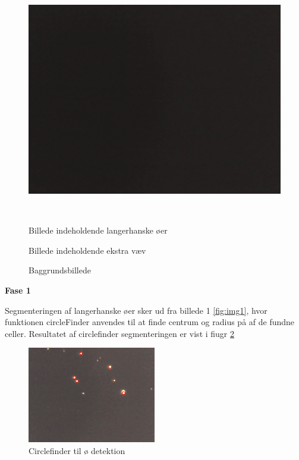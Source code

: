 \begin{figure}[htbp]
\begin{minipage}[b]{0.3\textwidth}
\includegraphics[width=1.00\textwidth]{billeder/software/3.jpg} %
\end{minipage} \\  %
\begin{minipage}[t]{0.3\textwidth}
\caption{Billede indeholdende langerhanske øer} %
\label{fig:img1}
\end{minipage} \hfill
\begin{minipage}[t]{0.3\textwidth}
\caption{Billede indeholdende ekstra væv} %
\label{fig:img2}
\end{minipage}
\hfill
\begin{minipage}[t]{0.3\textwidth}
\caption{Baggrundsbillede} %
\label{fig:img3}
\end{minipage}
\end{figure}

\textbf{Fase 1}

Segmenteringen af langerhanske øer sker ud fra billede 1 \ref{fig:img1}, hvor funktionen circleFinder anvendes til at finde centrum og radius på af de fundne celler. Resultatet af circlefinder segmenteringen er vist i fiugr \ref{fig:circlefinder} 

 \begin{figure}[H]
	\centering
	\includegraphics[width=0.5\textwidth]{billeder/software/circlefinder.png}
	\caption{Circlefinder til ø detektion}
	\label{fig:circlefinder}
\end{figure}

